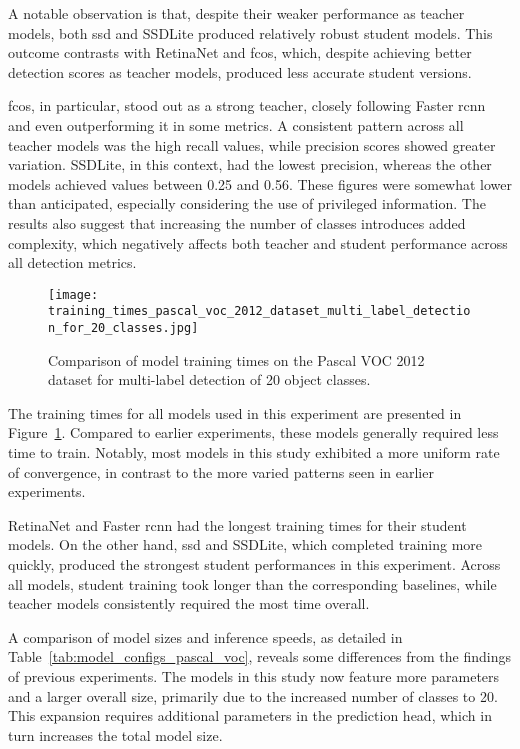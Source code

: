 A notable observation is that, despite their weaker performance as teacher models, both \gls{ssd} and SSDLite produced relatively robust student models. This outcome contrasts with RetinaNet and \gls{fcos}, which, despite achieving better detection scores as teacher models, produced less accurate student versions.

\gls{fcos}, in particular, stood out as a strong teacher, closely following Faster \gls{rcnn} and even outperforming it in some metrics. A consistent pattern across all teacher models was the high recall values, while precision scores showed greater variation. SSDLite, in this context, had the lowest precision, whereas the other models achieved values between 0.25 and 0.56. These figures were somewhat lower than anticipated, especially considering the use of privileged information. The results also suggest that increasing the number of classes introduces added complexity, which negatively affects both teacher and student performance across all detection metrics.

\begin{figure}[!ht]
    \centering
    \texttt{[image: training\_times\_pascal\_voc\_2012\_dataset\_multi\_label\_detection\_for\_20\_classes.jpg]}
    \caption{Comparison of model training times on the Pascal VOC 2012 dataset for multi-label detection of 20 object classes.}
    \label{fig:pascal_voc_training_time}
\end{figure}

The training times for all models used in this experiment are presented in Figure~\ref{fig:pascal_voc_training_time}. Compared to earlier experiments, these models generally required less time to train. Notably, most models in this study exhibited a more uniform rate of convergence, in contrast to the more varied patterns seen in earlier experiments.


RetinaNet and Faster \gls{rcnn} had the longest training times for their student models. On the other hand, \gls{ssd} and SSDLite, which completed training more quickly, produced the strongest student performances in this experiment. Across all models, student training took longer than the corresponding baselines, while teacher models consistently required the most time overall.

A comparison of model sizes and inference speeds, as detailed in Table~\ref{tab:model_configs_pascal_voc}, reveals some differences from the findings of previous experiments. The models in this study now feature more parameters and a larger overall size, primarily due to the increased number of classes to 20. This expansion requires additional parameters in the prediction head, which in turn increases the total model size.

